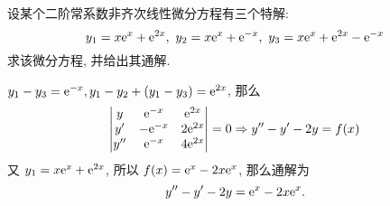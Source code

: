 
\begin{example}[1997 数二]
    设某个二阶常系数非齐次线性微分方程有三个特解:
    $$y_1=x\mathrm{e} ^x+\mathrm{e} ^{2x},~y_2=x\mathrm{e} ^x+\mathrm{e} ^{-x},~y_3=x\mathrm{e} ^x+\mathrm{e} ^{2x}-\mathrm{e} ^{-x}$$
    求该微分方程, 并给出其通解.
\end{example}
\begin{solution}
    $y_1-y_3=\mathrm{e} ^{-x}, y_1-y_2+(y_1-y_3)=\mathrm{e} ^{2x}$, 那么 $$
        \begin{vmatrix} y & \mathrm{e} ^{-x} & \mathrm{e} ^{2x} \\ y' & -\mathrm{e} ^{-x} & 2\mathrm{e} ^{2x} \\ y'' & \mathrm{e} ^{-x} & 4\mathrm{e} ^{2x} \\\end{vmatrix}=0\Rightarrow y''-y'-2y=f(x)
    $$
    又 $y_1=x\mathrm{e} ^{x}+\mathrm{e} ^{2x}$, 所以 $f(x)=\mathrm{e} ^{x}-2x\mathrm{e} ^{x}$, 那么通解为 $$
        y''-y'-2y=\mathrm{e} ^{x}-2x\mathrm{e} ^{x}.
    $$
\end{solution}

